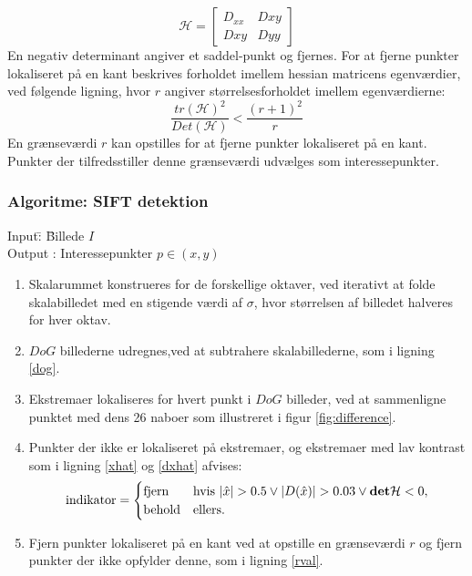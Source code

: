 \begin{equation}
\mathcal{H} =
\begin{bmatrix}
D_{xx} & D{xy} \\
D{xy} & D{yy}
\end{bmatrix}
\end{equation}
En negativ determinant angiver et saddel-punkt og fjernes. For at fjerne punkter lokaliseret på en kant beskrives forholdet imellem hessian matricens egenværdier, ved følgende ligning, hvor $r$ angiver størrelsesforholdet imellem egenværdierne:
\begin{equation}
\dfrac{tr(\mathcal{H})^2}{Det(\mathcal{H})}<\dfrac{(r+1)^2}{r}
\label{rval}
\end{equation}
En grænseværdi $r$ kan opstilles for at fjerne punkter lokaliseret på en kant. Punkter der tilfredsstiller denne grænseværdi udvælges som interessepunkter.
\subsubsection*{Algoritme: SIFT detektion}
\begin{tabbing}
Input\quad \= : \= Billede $I$\\
Output \text{ } \> : \> Interessepunkter $p \in (x,y)$
\end{tabbing}
\begin{enumerate}
\item{Skalarummet konstrueres for de forskellige oktaver, ved iterativt at folde skalabilledet med en stigende værdi af $\sigma$, hvor størrelsen af billedet halveres for hver oktav.}
\item{$DoG$ billederne udregnes,ved at subtrahere skalabillederne, som i ligning \eqref{dog}.}
\item{Ekstremaer lokaliseres for hvert punkt i $DoG$ billeder, ved at sammenligne punktet med dens 26 naboer som illustreret i figur \ref{fig:difference}.}
\item{Punkter der ikke er lokaliseret på ekstremaer, og ekstremaer med lav kontrast som i ligning \eqref{xhat} og \eqref{dxhat} afvises:
\begin{equation}
\begin{split}
\text{indikator} = 
\begin{cases}
\text{fjern}& \text{hvis } |\hat{x}|>0.5 \lor |D(\hat{x})|>0.03 \lor \bold{det} \mathcal{H}<0 , \\
\text{behold}& \text{ellers}. 
\end{cases}
\end{split}
\label{maxsurp}
\end{equation}
}
\item{Fjern punkter lokaliseret på en kant ved at opstille en grænseværdi $r$ og fjern punkter der ikke opfylder denne, som i ligning \eqref{rval}.}
\end{enumerate}